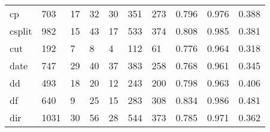 \begin{longtable}{lp{1.3cm}p{1.3cm}p{1.3cm}p{1.3cm}p{1.3cm}p{1.3cm}p{1.3cm}p{1.3cm}p{1.3cm}}
cp        &                    703 &                                 17 &                                32 &                               30 &                               351 &                             273 &                                   0.796 &                                  0.976 &                                0.388 \\
csplit    &                    982 &                                 15 &                                43 &                               17 &                               533 &                             374 &                                   0.808 &                                  0.985 &                                0.381 \\
cut       &                    192 &                                  7 &                                 8 &                                4 &                               112 &                              61 &                                   0.776 &                                  0.964 &                                0.318 \\
date      &                    747 &                                 29 &                                40 &                               37 &                               383 &                             258 &                                   0.768 &                                  0.961 &                                0.345 \\
dd        &                    493 &                                 18 &                                20 &                               12 &                               243 &                             200 &                                   0.798 &                                  0.963 &                                0.406 \\
df        &                    640 &                                  9 &                                25 &                               15 &                               283 &                             308 &                                   0.834 &                                  0.986 &                                0.481 \\
dir       &                   1031 &                                 30 &                                56 &                               28 &                               544 &                             373 &                                   0.785 &                                  0.971 &                                0.362 \\

\end{longtable}
